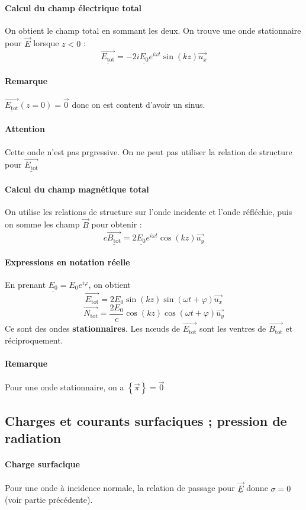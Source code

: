 \documentclass[french]{book}
\theoremstyle{plain}
\theoremstyle{definition}
\theoremstyle{remark}
\begin{document}
\paragraph{Calcul du champ électrique total} On obtient le champ total en sommant les deux. On trouve une onde stationnaire pour $\overrightarrow{E}$ lorsque $z<0$ : $$\underline{\overrightarrow{E_\text{tot}}}=-2i\underline{E_0}e^{i\omega t}\sin(kz)\overrightarrow{u_x}$$
\paragraph{Remarque} $\underline{\overrightarrow{E_\text{tot}}}(z=0)=\overrightarrow{0}$ donc on est content d'avoir un sinus.
\paragraph{Attention} Cette onde n'est pas prgressive. On ne peut pas utiliser la relation de structure pour $\underline{\overrightarrow{E_\text{tot}}}$
\paragraph{Calcul du champ magnétique total} On utilise les relations de structure sur l'onde incidente et l'onde réfléchie, puis on somme les champ $\overrightarrow{B}$ pour obtenir : $$c\underline{\overrightarrow{B_\text{tot}}}=2\underline{E_0}e^{i\omega t}\cos(kz)\overrightarrow{u_y}$$
\paragraph{Expressions en notation réelle} En prenant $\underline{E_0}=E_0e^{i\varphi}$, on obtient $$\overrightarrow{E_\text{tot}}=2E_0\sin(kz)\sin(\omega t+\varphi)\overrightarrow{u_x}$$
$$\overrightarrow{N_\text{tot}}= \frac{2E_0}{c}\cos(kz)\cos(\omega t+\varphi)\overrightarrow{u_y}$$ Ce sont des ondes \textbf{stationnaires}. Les nœuds de $\overrightarrow{E_\text{tot}}$ sont les ventres de $\overrightarrow{B_\text{tot}}$ et réciproquement.
\paragraph{Remarque} Pour une onde stationnaire, on a $\left\{\overrightarrow{\pi}\right\}=\overrightarrow{0}$
\subsection{Charges et courants surfaciques ; pression de radiation}
\paragraph{Charge surfacique} Pour une onde à incidence normale, la relation de passage pour $\underline{\overrightarrow{E}}$ donne $\sigma=0$ (voir partie précédente).
\end{document}
